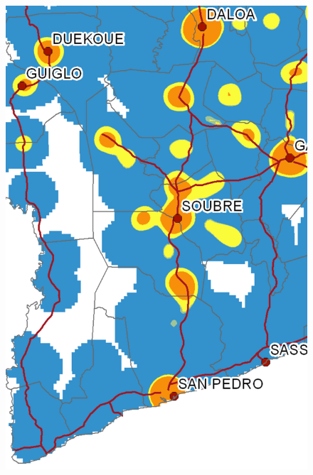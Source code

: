 \begin{figure}
{    \includegraphics[scale = 0.15]{results/images/kernel/l_hour19_kd_detail.pdf}
	\label{fig:subfig2_detail}
}
\subfigure[Wednesday, 10:00]{
}
\end{figure}
